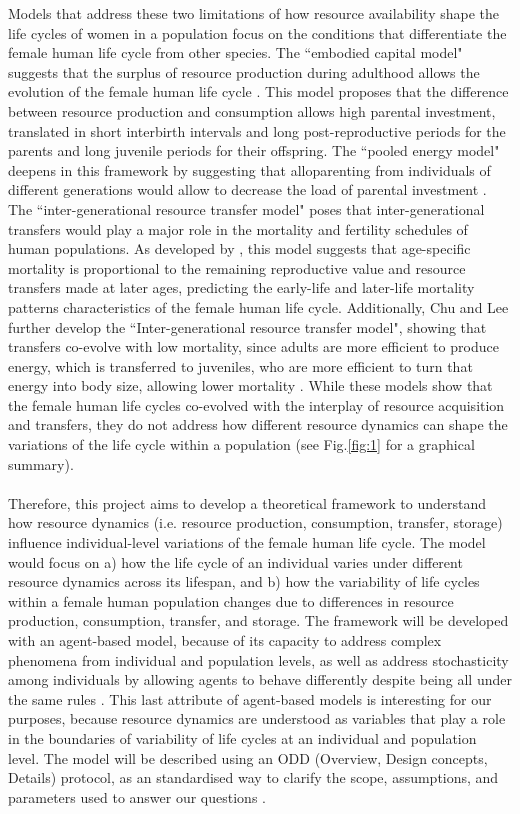 \documentclass{article}
\begin{document}
Models that address these two limitations of how resource availability shape the life cycles of women in a population focus on the conditions that differentiate the female human life cycle from other species. The ``embodied capital model" suggests that the surplus of resource production during adulthood allows the evolution of the female human life cycle \citep{kaplan2000theory}. This model proposes that the difference between resource production and consumption allows high parental investment, translated in short interbirth intervals and long post-reproductive periods for the parents and long juvenile periods for their offspring. The ``pooled energy model" deepens in this framework by suggesting that alloparenting from individuals of different generations would allow to decrease the load of parental investment \citep{kramer2010pooled}. The ``inter-generational resource transfer model" poses that inter-generational transfers would play a major role in the mortality and fertility schedules of human populations. As developed by \cite{lee2003rethinking}, this model suggests that age-specific mortality is proportional to the remaining reproductive value and resource transfers made at later ages, predicting the early-life and later-life mortality patterns characteristics of the female human life cycle. Additionally, Chu and Lee further develop the ``Inter-generational resource transfer model", showing that transfers co-evolve with low mortality, since adults are more efficient to produce energy, which is transferred to juveniles, who are more efficient to turn that energy into body size, allowing lower mortality \citep{chu2006co}. While these models show that the female human life cycles co-evolved with the interplay of resource acquisition and transfers, they do not address how different resource dynamics can shape the variations of the life cycle within a population (see Fig.\ref{fig:1} for a graphical summary).
\\\\
Therefore, this project aims to develop a theoretical framework to understand how resource dynamics (i.e. resource production, consumption, transfer, storage) influence individual-level variations of the female human life cycle. The model would focus on a) how the life cycle of an individual varies under different resource dynamics across its lifespan, and b) how the variability of life cycles within a female human population changes due to differences in resource production, consumption, transfer, and storage. The framework will be developed with an agent-based model, because of its capacity to address complex phenomena from individual and population levels, as well as address stochasticity among individuals by allowing agents to behave differently despite being all under the same rules \citep{judson1994rise,wilensky2015introduction}. This last attribute of agent-based models is interesting for our purposes, because resource dynamics are understood as variables that play a role in the boundaries of variability of life cycles at an individual and population level. The model will be described using an ODD (Overview, Design concepts, Details) protocol, as an standardised way to clarify the scope, assumptions, and parameters used to answer our questions \citep{grimm2006standard,grimm2020odd}.
\end{document}
